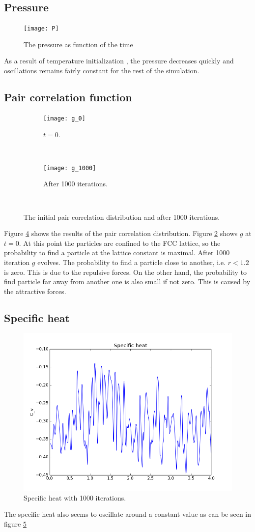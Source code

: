 \documentclass[10pt,a4paper,notitlepage]{article}
\begin{document}
\subsection{Pressure}
\begin{figure}[h]
\centering
\texttt{[image: P]}
\caption{The pressure as function of the time}
\label{fig:P}
\end{figure}
As a result of temperature initialization , the pressure decreases quickly and oscillations remains fairly constant for the rest of the simulation.
\subsection{Pair correlation function}
\begin{figure}[h!]
        \centering
        \begin{subfigure}[h]{0.45\textwidth}
                \texttt{[image: g\_0]}
                \caption{$t=0$.}
                \label{fig:g_0}
        \end{subfigure}%
        ~ 
        \begin{subfigure}[h]{0.45\textwidth}
                \texttt{[image: g\_1000]}
                \caption{After 1000 iterations.}
                \label{fig:g_1000}
        \end{subfigure}
        ~ 
        \caption{The initial pair correlation distribution and after 1000 iterations.}\label{fig:g}
\end{figure}
Figure \ref{fig:g} shows the results of the pair correlation distribution. Figure \ref{fig:g_0} shows $g$ at $t=0$. At this point the particles are confined to the FCC lattice, so the probability to find a particle at the lattice constant is maximal. After 1000 iteration $g$ evolves. The probability to find a particle close to another, i.e. $r<1.2$ is zero. This is due to the repulsive forces. On the other hand, the probability to find particle far away from another one is also small if not zero. This is caused by the attractive forces.
\subsection{Specific heat}
\begin{figure}[h!]
\centering
\includegraphics[width=0.7\linewidth]{cv_1000}
\caption{Specific heat with 1000 iterations.}
\label{fig:cv_1000}
\end{figure}
The specific heat also seems to oscillate around a constant value as can be seen in figure \ref{fig:cv_1000}
\end{document}
